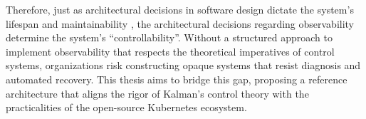 Therefore, just as architectural decisions in software design dictate the system's lifespan and maintainability \cite{Tang_Razavian_Paech_Hesse_2017}, the architectural decisions regarding observability determine the system's ``controllability''. Without a structured approach to implement observability that respects the theoretical imperatives of control systems, organizations risk constructing opaque systems that resist diagnosis and automated recovery. This thesis aims to bridge this gap, proposing a reference architecture that aligns the rigor of Kalman's control theory with the practicalities of the open-source Kubernetes ecosystem. 




  

 





